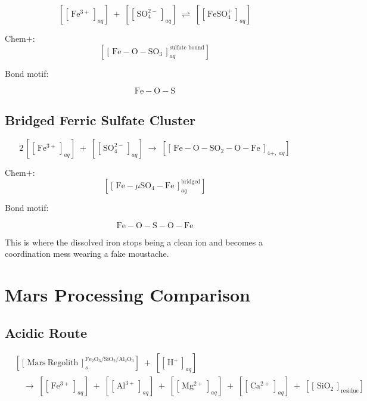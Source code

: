 \documentclass[11pt,a4paper]{article}
\newcommand{\cid}[3]{\!\left[\!\left[\,#1\,\right]^{\!#2}_{\!#3}\!\right]}
\newcommand{\cidb}[2]{\!\left[\!\left[\,#1\,\right]_{\!#2}\!\right]}
\begin{document}
\[
\cidb{\mathrm{Fe^{3+}}}{aq}
\;+\;\cidb{\mathrm{SO_4^{2-}}}{aq}
\;\rightleftharpoons\;
\cidb{\mathrm{FeSO_4^+}}{aq}
\]

Chem+:
\[
\cid{\mathrm{Fe{-}O{-}SO_3}}{\text{sulfate bound}}{aq}
\]

Bond motif:
\begin{keybox}
\[\mathrm{Fe{-}O{-}S}\]
\end{keybox}

\subsection{Bridged Ferric Sulfate Cluster}

\[
2\,\cidb{\mathrm{Fe^{3+}}}{aq}
\;+\;\cidb{\mathrm{SO_4^{2-}}}{aq}
\;\rightarrow\;
\cidb{\mathrm{Fe{-}O{-}SO_2{-}O{-}Fe}}{4+,\;aq}
\]

Chem+:
\[
\cid{\mathrm{Fe{-}}\mu\mathrm{SO_4{-}Fe}}{\text{bridged}}{aq}
\]

Bond motif:
\begin{keybox}
\[\mathrm{Fe{-}O{-}S{-}O{-}Fe}\]
\end{keybox}

\begin{smlaw}
This is where the dissolved iron stops being a clean ion and becomes a
coordination mess wearing a fake moustache.
\end{smlaw}

\section{Mars Processing Comparison}

\subsection*{Acidic Route}

\begin{align*}
&\cid{\mathrm{Mars~Regolith}}{\mathrm{Fe_2O_3/SiO_2/Al_2O_3}}{s}
 \;+\;\cidb{\mathrm{H^+}}{aq}\\[6pt]
&\quad\rightarrow\;
  \cidb{\mathrm{Fe^{3+}}}{aq}
  \;+\;\cidb{\mathrm{Al^{3+}}}{aq}
  \;+\;\cidb{\mathrm{Mg^{2+}}}{aq}
  \;+\;\cidb{\mathrm{Ca^{2+}}}{aq}
  \;+\;\cidb{\mathrm{SiO_2}}{\text{residue}}
\end{align*}
\end{document}

